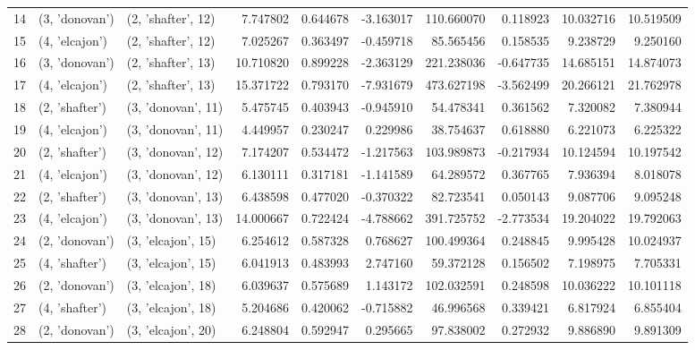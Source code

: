 \begin{tabular}{lllrrrrrrr}
14 &   (3, 'donovan') &  (2, 'shafter', 12) &   7.747802 &   0.644678 &  -3.163017 &  110.660070 &  0.118923 &  10.032716 &  10.519509 \\
15 &   (4, 'elcajon') &  (2, 'shafter', 12) &   7.025267 &   0.363497 &  -0.459718 &   85.565456 &  0.158535 &   9.238729 &   9.250160 \\
16 &   (3, 'donovan') &  (2, 'shafter', 13) &  10.710820 &   0.899228 &  -2.363129 &  221.238036 & -0.647735 &  14.685151 &  14.874073 \\
17 &   (4, 'elcajon') &  (2, 'shafter', 13) &  15.371722 &   0.793170 &  -7.931679 &  473.627198 & -3.562499 &  20.266121 &  21.762978 \\
18 &   (2, 'shafter') &  (3, 'donovan', 11) &   5.475745 &   0.403943 &  -0.945910 &   54.478341 &  0.361562 &   7.320082 &   7.380944 \\
19 &   (4, 'elcajon') &  (3, 'donovan', 11) &   4.449957 &   0.230247 &   0.229986 &   38.754637 &  0.618880 &   6.221073 &   6.225322 \\
20 &   (2, 'shafter') &  (3, 'donovan', 12) &   7.174207 &   0.534472 &  -1.217563 &  103.989873 & -0.217934 &  10.124594 &  10.197542 \\
21 &   (4, 'elcajon') &  (3, 'donovan', 12) &   6.130111 &   0.317181 &  -1.141589 &   64.289572 &  0.367765 &   7.936394 &   8.018078 \\
22 &   (2, 'shafter') &  (3, 'donovan', 13) &   6.438598 &   0.477020 &  -0.370322 &   82.723541 &  0.050143 &   9.087706 &   9.095248 \\
23 &   (4, 'elcajon') &  (3, 'donovan', 13) &  14.000667 &   0.722424 &  -4.788662 &  391.725752 & -2.773534 &  19.204022 &  19.792063 \\
24 &   (2, 'donovan') &  (3, 'elcajon', 15) &   6.254612 &   0.587328 &   0.768627 &  100.499364 &  0.248845 &   9.995428 &  10.024937 \\
25 &   (4, 'shafter') &  (3, 'elcajon', 15) &   6.041913 &   0.483993 &   2.747160 &   59.372128 &  0.156502 &   7.198975 &   7.705331 \\
26 &   (2, 'donovan') &  (3, 'elcajon', 18) &   6.039637 &   0.575689 &   1.143172 &  102.032591 &  0.248598 &  10.036222 &  10.101118 \\
27 &   (4, 'shafter') &  (3, 'elcajon', 18) &   5.204686 &   0.420062 &  -0.715882 &   46.996568 &  0.339421 &   6.817924 &   6.855404 \\
28 &   (2, 'donovan') &  (3, 'elcajon', 20) &   6.248804 &   0.592947 &   0.295665 &   97.838002 &  0.272932 &   9.886890 &   9.891309 \\

\end{tabular}
